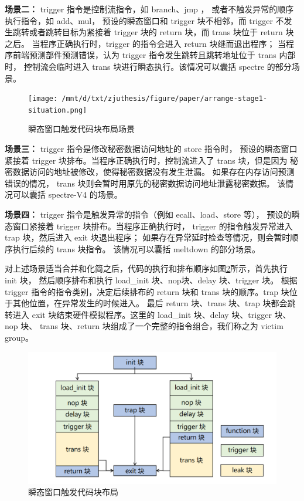 \textbf{场景二：} trigger 指令是控制流指令，如 branch、jmp ，
或者不触发异常的顺序执行指令，如 add、mul，
预设的瞬态窗口和 trigger 块不相邻，而 trigger 不发生跳转或者跳转目标为紧接着 trigger 块的
 return 块，而 trans 块位于 return 块之后。
当程序正确执行时，trigger 的指令会进入 return 块继而退出程序；
当程序前端预测部件预测错误，认为 trigger 指令发生跳转且跳转地址位于 trans 内部时，
控制流会临时进入 trans 块进行瞬态执行。该情况可以囊括 spectre 的部分场景。\par

\begin{figure}[!h]
    \centering
    \texttt{[image: /mnt/d/txt/zjuthesis/figure/paper/arrange-stage1-situation.png]}
    \caption{瞬态窗口触发代码块布局场景}
    \label{paper:trigger-dist-situation}
\end{figure}

\textbf{场景三：} trigger 指令是修改秘密数据访问地址的 store 指令时，
预设的瞬态窗口紧接着 trigger 块排布。当程序正确执行时，控制流进入了 trans 块，但是因为
秘密数据访问的地址被修改，使得秘密数据没有发生泄漏。
如果存在内存访问预测错误的情况， trans 块则会暂时用原先的秘密数据访问地址泄露秘密数据。
该情况可以囊括 spectre-V4 的场景。\par

\textbf{场景四：} trigger 指令是触发异常的指令（例如 ecall、load、store 等），
预设的瞬态窗口紧接着 trigger 块排布。当程序正确执行时，
trigger 的指令触发异常进入 trap 块，然后进入 exit 块退出程序；
如果存在异常延时检查等情况，则会暂时顺序执行后续的 trans 块指令。
该情况可以囊括 meltdown 的部分场景。\par

对上述场景适当合并和化简之后，代码的执行和排布顺序如图\ref{paper:trigger-dist}所示，首先执行 init 块，
然后顺序排布和执行 load\_init 块、nop块、delay 块、trigger 块。
根据 trigger 指令的指令类别，决定后续排布的 return 块和 trans 块的顺序。trap 块位于其他位置，在异常发生的时候进入。
最后 return 块、trans 块、trap 块都会跳转进入 exit 块结束硬件模拟程序。这里的 load\_init 块、delay 块、trigger 块、nop 块、
trans 块、return 块组成了一个完整的指令组合，我们称之为 victim group。\par

\begin{figure}[!h]
    \centering
    \includegraphics[width=0.8\linewidth]{figure/paper/arrange-stage1.png}
    \caption{瞬态窗口触发代码块布局}
    \label{paper:trigger-dist}
\end{figure}

